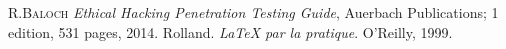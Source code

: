 \begin{thebibliography}{ABC}	
     R.\textsc{Baloch} \emph{Ethical Hacking Penetration Testing Guide}, Auerbach Publications; 1 edition, 531 pages, 2014.
     Rolland. \emph{LaTeX par la pratique}. O'Reilly, 1999.
\end{thebibliography}
